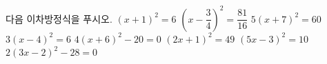다음 이차방정식을 푸시오.
 $(x+1)^2=6$
 $\left(x-\dfrac{3}{4}\right)^2=\dfrac{81}{16}$
 $5(x+7)^2=60$
 $3(x-4)^2=6$
 $4(x+6)^2-20=0$
 $(2x+1)^2=49$
 $(5x-3)^2=10$
 $2(3x-2)^2-28=0$
